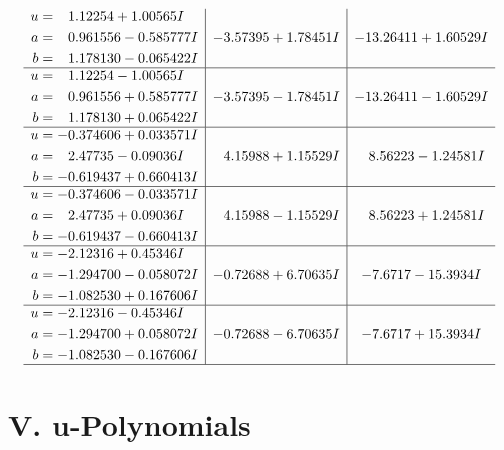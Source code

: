 \documentclass[1p]{elsarticle_modified}
\theoremstyle{definition}
\begin{document}
$$\begin{array}{c|c|c}
\begin{aligned}
u &= \phantom{-}1.12254 + 1.00565 I \\
a &= \phantom{-}0.961556 - 0.585777 I \\
b &= \phantom{-}1.178130 - 0.065422 I\end{aligned}
 & -3.57395 + 1.78451 I & -13.26411 + 1.60529 I \\ \hline\begin{aligned}
u &= \phantom{-}1.12254 - 1.00565 I \\
a &= \phantom{-}0.961556 + 0.585777 I \\
b &= \phantom{-}1.178130 + 0.065422 I\end{aligned}
 & -3.57395 - 1.78451 I & -13.26411 - 1.60529 I \\ \hline\begin{aligned}
u &= -0.374606 + 0.033571 I \\
a &= \phantom{-}2.47735 - 0.09036 I \\
b &= -0.619437 + 0.660413 I\end{aligned}
 & \phantom{-}4.15988 + 1.15529 I & \phantom{-}8.56223 - 1.24581 I \\ \hline\begin{aligned}
u &= -0.374606 - 0.033571 I \\
a &= \phantom{-}2.47735 + 0.09036 I \\
b &= -0.619437 - 0.660413 I\end{aligned}
 & \phantom{-}4.15988 - 1.15529 I & \phantom{-}8.56223 + 1.24581 I \\ \hline\begin{aligned}
u &= -2.12316 + 0.45346 I \\
a &= -1.294700 - 0.058072 I \\
b &= -1.082530 + 0.167606 I\end{aligned}
 & -0.72688 + 6.70635 I & -7.6717 - 15.3934 I \\ \hline\begin{aligned}
u &= -2.12316 - 0.45346 I \\
a &= -1.294700 + 0.058072 I \\
b &= -1.082530 - 0.167606 I\end{aligned}
 & -0.72688 - 6.70635 I & -7.6717 + 15.3934 I\\
 \hline 
 \end{array}$$\newpage
\newpage\renewcommand{\arraystretch}{1}
\centering \section*{ V. u-Polynomials}
\end{document}
